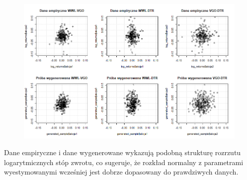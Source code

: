 \documentclass[a4paper,11pt]{article}
\begin{document}
\begin{figure}[H]
    \centering
    \includegraphics[width=1\textwidth]{./img/dane empiryczne-proba wygenerowana pary.png}
\end{figure}

Dane empiryczne i dane wygenerowane wykazują podobną strukturę rozrzutu logarytmicznych stóp zwrotu, co sugeruje, że rozkład normalny z parametrami wyestymowanymi wcześniej jest dobrze dopasowany do prawdziwych danych.
\end{document}
